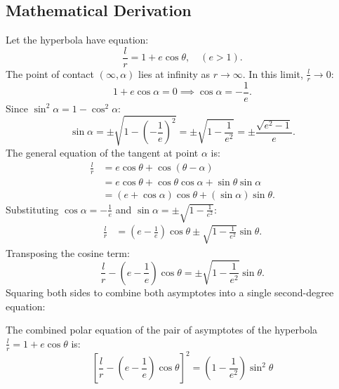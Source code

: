 \subsection{Mathematical Derivation}
Let the hyperbola have equation:
\begin{equation}
    \frac{l}{r} = 1 + e\cos\theta, \quad (e > 1).
\end{equation}
The point of contact $(\infty, \alpha)$ lies at infinity as $r \to \infty$. In this limit, $\frac{l}{r} \to 0$:
\begin{equation}
    1 + e\cos\alpha = 0 \implies \cos\alpha = -\frac{1}{e}.
\end{equation}
Since $\sin^2\alpha = 1 - \cos^2\alpha$:
\begin{equation}
    \sin\alpha = \pm \sqrt{1 - \left(-\frac{1}{e}\right)^2} = \pm \sqrt{1 - \frac{1}{e^2}} = \pm \frac{\sqrt{e^2 - 1}}{e}.
\end{equation}
The general equation of the tangent at point $\alpha$ is:
\begin{align}
    \frac{l}{r} &= e\cos\theta + \cos(\theta - \alpha) \nonumber\\
                &= e\cos\theta + \cos\theta\cos\alpha + \sin\theta\sin\alpha \nonumber\\
                &= (e + \cos\alpha)\cos\theta + (\sin\alpha)\sin\theta.
\end{align}
Substituting $\cos\alpha = -\frac{1}{e}$ and $\sin\alpha = \pm \sqrt{1 - \frac{1}{e^2}}$:
\begin{align}
    \frac{l}{r} &= \left(e - \frac{1}{e}\right)\cos\theta \pm \sqrt{1 - \frac{1}{e^2}}\sin\theta.
\end{align}
Transposing the cosine term:
\begin{equation}
    \frac{l}{r} - \left(e - \frac{1}{e}\right)\cos\theta = \pm \sqrt{1 - \frac{1}{e^2}}\sin\theta.
\end{equation}
Squaring both sides to combine both asymptotes into a single second-degree equation:

\begin{theorembox}
The combined polar equation of the pair of asymptotes of the hyperbola $\frac{l}{r} = 1 + e\cos\theta$ is:
\begin{equation}
    \boxed{\left[\frac{l}{r} - \left(e - \frac{1}{e}\right)\cos\theta\right]^2 = \left(1 - \frac{1}{e^2}\right)\sin^2\theta}
\end{equation}
\end{theorembox}

